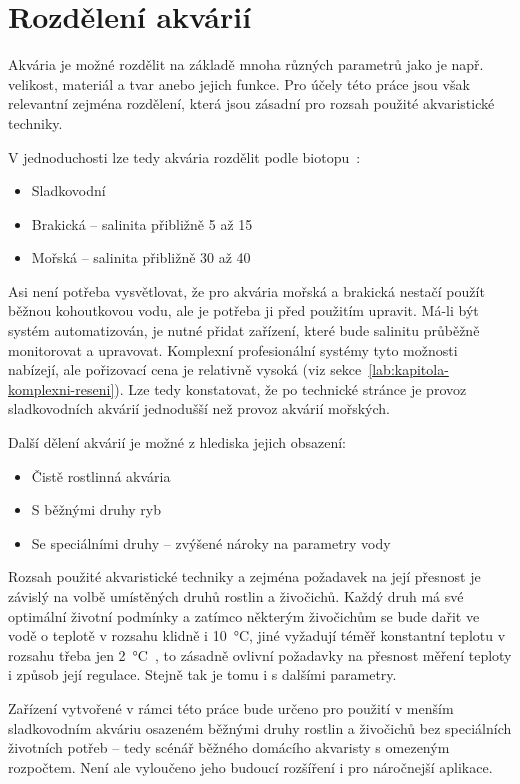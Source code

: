 \section{Rozdělení akvárií}
Akvária je možné rozdělit na základě mnoha různých parametrů jako je např. velikost, materiál a tvar anebo jejich funkce. Pro účely této práce jsou však relevantní zejména rozdělení, která jsou zásadní pro rozsah použité akvaristické techniky. 

V jednoduchosti lze tedy akvária rozdělit podle biotopu~\cite{haskova_bakalarska2011}:
\begin{itemize}
    \item Sladkovodní
    \item Brakická -- salinita přibližně 5 až \qty{15}{\permille}
    \item Mořská -- salinita přibližně 30 až \qty{40}{\permille}
\end{itemize}

Asi není potřeba vysvětlovat, že pro akvária mořská a brakická nestačí použít běžnou kohoutkovou vodu, ale je potřeba ji před použitím upravit. Má-li být systém automatizován, je nutné přidat zařízení, které bude salinitu průběžně monitorovat a upravovat. Komplexní profesionální systémy tyto možnosti nabízejí, ale pořizovací cena je relativně vysoká (viz sekce~\ref{lab:kapitola-komplexni-reseni}). Lze tedy konstatovat, že po technické stránce je provoz sladkovodních akvárií jednodušší než provoz akvárií mořských. 

Další dělení akvárií je možné z hlediska jejich obsazení:
\begin{itemize}
    \item Čistě rostlinná akvária
    \item S běžnými druhy ryb
    \item Se speciálními druhy -- zvýšené nároky na parametry vody
\end{itemize}
Rozsah použité akvaristické techniky a zejména požadavek na její přesnost je závislý na volbě umístěných druhů rostlin a živočichů. Každý druh má své optimální životní podmínky a zatímco některým živočichům se bude dařit ve vodě o teplotě v rozsahu klidně i \qty{10}{\degreeCelsius}, jiné vyžadují téměř konstantní teplotu v rozsahu třeba jen \qty{2}{\degreeCelsius}~\cite{MusilLibor2018Isps}, to zásadně ovlivní požadavky na přesnost měření teploty i způsob její regulace. Stejně tak je tomu i s dalšími parametry.

Zařízení vytvořené v rámci této práce bude určeno pro použití v menším sladkovodním akváriu osazeném běžnými druhy rostlin a živočichů bez speciálních životních potřeb -- tedy scénář běžného domácího akvaristy s omezeným rozpočtem. Není ale vyloučeno jeho budoucí rozšíření i pro náročnejší aplikace.
